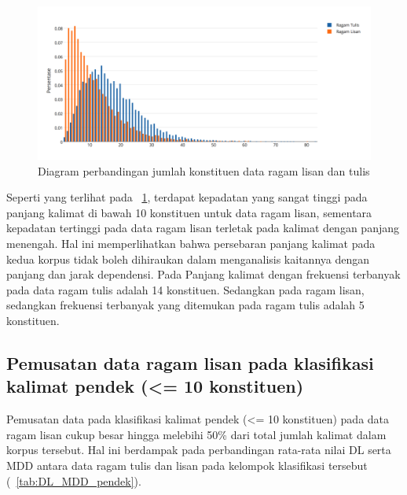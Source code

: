 \begin{figure}
	\centering \includegraphics[width=1
	\textwidth] {pics/Jumlah_kata.png} 
	\caption{Diagram perbandingan jumlah konstituen data ragam lisan dan tulis} 
	\label{fig:jumlah_kata} 
\end{figure}

Seperti yang terlihat pada \pic~\ref{fig:jumlah_kata}, terdapat kepadatan yang sangat tinggi pada panjang kalimat di bawah 10 konstituen untuk data ragam lisan, sementara kepadatan tertinggi pada data ragam lisan terletak pada kalimat dengan panjang menengah. Hal ini memperlihatkan bahwa persebaran panjang kalimat pada kedua korpus tidak boleh dihiraukan dalam menganalisis kaitannya dengan panjang dan jarak dependensi. Pada Panjang kalimat dengan frekuensi terbanyak pada data ragam tulis adalah 14 konstituen. Sedangkan pada ragam lisan, sedangkan frekuensi terbanyak yang ditemukan pada ragam tulis adalah 5 konstituen.

\subsection{Pemusatan data ragam lisan pada klasifikasi kalimat pendek (\textless= 10 konstituen)}
Pemusatan data pada klasifikasi kalimat pendek (\textless= 10 konstituen) pada data ragam lisan cukup besar hingga melebihi 50\% dari total jumlah kalimat dalam korpus tersebut. Hal ini berdampak pada perbandingan rata-rata nilai DL serta MDD antara data ragam tulis dan lisan pada kelompok klasifikasi tersebut (\tab~\ref{tab:DL_MDD_pendek}).

